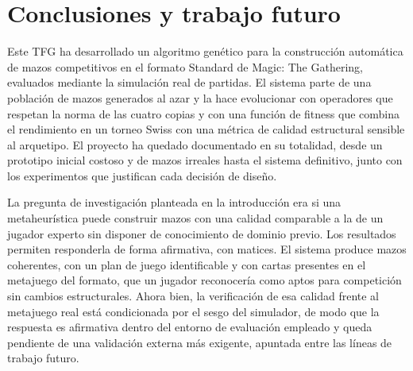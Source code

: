 
\chapter{Conclusiones y trabajo futuro}
\label{cap:conclusiones}

Este TFG ha desarrollado un algoritmo genético para la construcción automática de mazos competitivos en el formato Standard de Magic: The Gathering, evaluados mediante la simulación real de partidas. El sistema parte de una población de mazos generados al azar y la hace evolucionar con operadores que respetan la norma de las cuatro copias y con una función de fitness que combina el rendimiento en un torneo Swiss con una métrica de calidad estructural sensible al arquetipo. El proyecto ha quedado documentado en su totalidad, desde un prototipo inicial costoso y de mazos irreales hasta el sistema definitivo, junto con los experimentos que justifican cada decisión de diseño.

La pregunta de investigación planteada en la introducción era si una metaheurística puede construir mazos con una calidad comparable a la de un jugador experto sin disponer de conocimiento de dominio previo. Los resultados permiten responderla de forma afirmativa, con matices. El sistema produce mazos coherentes, con un plan de juego identificable y con cartas presentes en el metajuego del formato, que un jugador reconocería como aptos para competición sin cambios estructurales. Ahora bien, la verificación de esa calidad frente al metajuego real está condicionada por el sesgo del simulador, de modo que la respuesta es afirmativa dentro del entorno de evaluación empleado y queda pendiente de una validación externa más exigente, apuntada entre las líneas de trabajo futuro.

